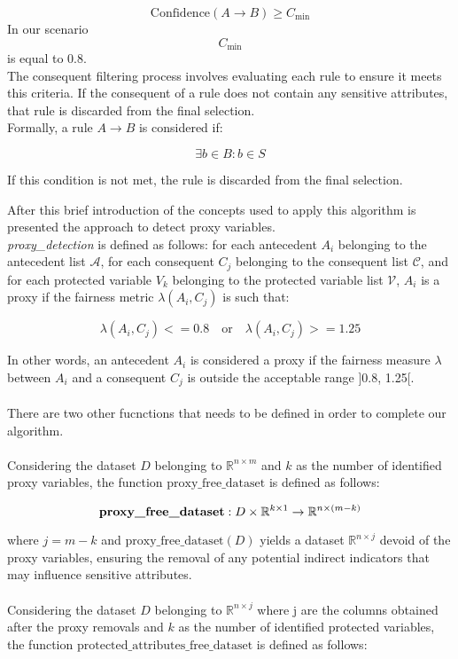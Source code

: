 \documentclass[12pt,a4paper,openright,twoside]{book}
\begin{document}
\begin{enumerate}
\[
\text{Confidence}(A \rightarrow B) \geq C_{\text{min}}
\]
In our scenario
\[
C_{\text{min}}
\]
is equal to 0.8. \\

The consequent filtering process involves evaluating each rule to ensure it meets this criteria. If the consequent of a rule does not contain any sensitive attributes, that rule is discarded from the final selection. \\

Formally, a rule $A \rightarrow B$ is considered if:

\[
\exists b \in B : b \in S
\]

If this condition is not met, the rule is discarded from the final selection.
\end{enumerate}
After this brief introduction of the concepts used to apply this algorithm is presented the approach to detect proxy variables. \\
\textit{proxy\_detection} is defined as follows: for each antecedent \( A_i \) belonging to the antecedent list \( \mathcal{A} \), for each consequent \( C_j \) belonging to the consequent list \( \mathcal{C} \), and for each protected variable \( V_k \) belonging to the protected variable list \( \mathcal{V} \), \( A_i \) is a proxy if the fairness metric \( \lambda(A_i, C_j) \) is such that:

\[\lambda(A_i, C_j) <= 0.8 \quad \text{or} \quad \lambda(A_i, C_j) >= 1.25\]

In other words, an antecedent \( A_i \) is considered a proxy if the fairness measure \( \lambda \) between \( A_i \) and a consequent \( C_j \) is outside the acceptable range ]0.8, 1.25[.
\\
\\
There are two other fucnctions that needs to be defined in order to complete our algorithm.
\\
\\
Considering the dataset \( D \) belonging to \( \mathbb{R}^{n \times m} \) and \( k \) as the number of identified proxy variables, the function \( \text{proxy\_free\_dataset} \) is defined as follows:

\[
\text{\textbf{proxy\_free\_dataset}}: D \times \mathbb{R}^{k \times 1} \rightarrow \mathbb{R}^{n \times (m - k)}
\]

where \( j = m - k \) and \( \text{proxy\_free\_dataset}(D) \) yields a dataset \( \mathbb{R}^{n \times j} \) devoid of the proxy variables, ensuring the removal of any potential indirect indicators that may influence sensitive attributes. \\
\\
Considering the dataset \( D \) belonging to \( \mathbb{R}^{n \times j} \) where j are the columns obtained after the proxy removals and \( k \) as the number of identified protected variables, the function \( \text{protected\_attributes\_free\_dataset} \) is defined as follows:
\end{document}
